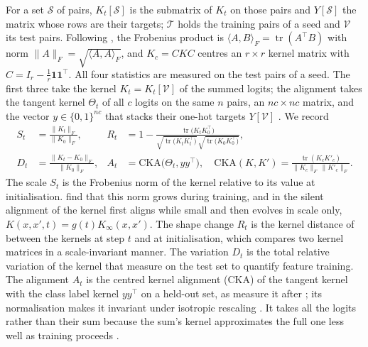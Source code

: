 \documentclass[a4paper,11pt]{article} %
\begin{document}
For a set $\mathcal{S}$ of pairs, $K_t[\mathcal{S}]$ is the submatrix of $K_t$
on those pairs and $Y[\mathcal{S}]$ the matrix whose rows are their targets;
$\mathcal{T}$ holds the training pairs of a seed and $\mathcal{V}$ its test
pairs. Following \citet{cortesAlgorithmsLearningKernels2024}, the Frobenius
product is $\langle A,B\rangle_F=\operatorname{tr}(A^\top B)$ with norm
$\lVert A\rVert_F=\sqrt{\langle A,A\rangle_F}$, and $K_c=CKC$ centres an
$r\times r$ kernel matrix with $C=I_r-\frac{1}{r}\mathbf{1}\mathbf{1}^\top$.
All four statistics are measured on the test pairs of a seed. The first three
take the kernel $K_t=K_t[\mathcal{V}]$ of the summed logits; the alignment takes
the tangent kernel $\Theta_t$ of all $c$ logits on the same $n$ pairs, an
$nc\times nc$ matrix, and the vector $y\in\{0,1\}^{nc}$ that stacks their
one-hot targets $Y[\mathcal{V}]$ \citep[supplement, Sampled
Versions]{baratinImplicitRegularizationNeural2021}. We record
\begin{equation}
  \begin{aligned}
    S_t &= \frac{\lVert K_t\rVert_F}{\lVert K_0\rVert_F}, &
    R_t &= 1-\frac{\operatorname{tr}\bigl(K_tK_0^\top\bigr)}
    {\sqrt{\operatorname{tr}\bigl(K_tK_t^\top\bigr)}\,
    \sqrt{\operatorname{tr}\bigl(K_0K_0^\top\bigr)}},\\
    D_t &= \frac{\lVert K_t-K_0\rVert_F}{\lVert K_0\rVert_F}, &
    A_t &= \mathrm{CKA}\bigl(\Theta_t,yy^\top\bigr),\quad
    \mathrm{CKA}(K,K') = \frac{\operatorname{tr}(K_c{K'}_c)}
    {\lVert K_c\rVert_F\,\lVert {K'}_c\rVert_F}.
  \end{aligned}
  \label{eq:statistics}
\end{equation}
The scale $S_t$ is the Frobenius norm of the kernel relative to its value at
initialisation.  find that this norm grows
during training, and in the silent alignment of
\citet{atanasovNeuralNetworksKernel2021} the kernel first aligns while small
and then evolves in scale only, $K(x,x',t)=g(t)K_\infty(x,x')$. The shape
change $R_t$ is the kernel distance of \citet{fortDeepLearningKernel2020}
between the kernels at step $t$ and at initialisation, which compares two
kernel matrices in a scale-invariant manner. The variation $D_t$ is the total
relative variation of the kernel that \citet{geigerDisentanglingFeatureLazy2020}
measure on the test set to quantify feature training. The alignment $A_t$ is
the centred kernel alignment (CKA) of the tangent kernel with the class label
kernel $yy^\top$ on a held-out set, as
\citet{baratinImplicitRegularizationNeural2021}
measure it after \citet{cortesAlgorithmsLearningKernels2024}; its normalisation
makes it invariant under isotropic rescaling
\citep{baratinImplicitRegularizationNeural2021}. It takes all the logits
rather than their sum because the sum's kernel approximates the full one less
well as training proceeds \citep{mohamadiFastWellFoundedApproximation2022}.
\end{document}
